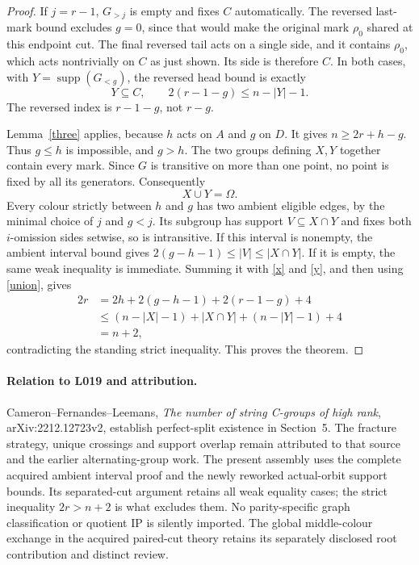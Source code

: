 \documentclass[11pt,a4paper]{article}
\begin{document}
\begin{proof}
If $j=r-1$, $G_{>j}$ is empty and fixes $C$ automatically.
The reversed last-mark bound excludes $g=0$, since that
would make the original mark $\rho_0$ shared at this
endpoint cut. The final reversed tail acts on a single
side, and it contains $\rho_0$, which acts nontrivially
on $C$ as just shown. Its side is therefore $C$.
In both cases, with $Y=\operatorname{supp}(G_{<g})$,
the reversed head bound is exactly
\begin{equation}\label{y}
 Y\subseteq C,\qquad 2(r-1-g)\le n-|Y|-1.
\end{equation}
The reversed index is $r-1-g$, not $r-g$.

Lemma~\ref{three} applies, because $h$ acts on $A$ and
$g$ on $D$. It gives $n\ge2r+h-g$. Thus $g\le h$
is impossible, and $g>h$.
The two groups defining $X,Y$ together contain every
mark. Since $G$ is transitive on more than one point,
no point is fixed by all its generators. Consequently
\begin{equation}\label{union}
                         X\cup Y=\Omega.
\end{equation}
Every colour strictly between $h$ and $g$ has two ambient
eligible edges, by the minimal choice of $j$ and $g<j$.
Its subgroup has support $V\subseteq X\cap Y$ and fixes
both $i$-omission sides setwise, so is intransitive.
If this interval is nonempty, the ambient interval bound
gives $2(g-h-1)\le |V|\le|X\cap Y|$. If it is empty,
the same weak inequality is immediate. Summing it with
\eqref{x} and \eqref{y}, and then using \eqref{union},
gives
\[
\begin{split}
 2r&=2h+2(g-h-1)+2(r-1-g)+4\\
   &\le(n-|X|-1)+|X\cap Y|+(n-|Y|-1)+4\\
   &=n+2,
\end{split}
\]
contradicting the standing strict inequality. This proves
the theorem.
\end{proof}

\paragraph{Relation to L019 and attribution.}
Cameron--Fernandes--Leemans, \emph{The number of string
C-groups of high rank}, arXiv:2212.12723v2, establish
perfect-split existence in Section~5. The fracture strategy,
unique crossings and support overlap remain attributed to
that source and the earlier alternating-group work.
The present assembly uses the complete acquired ambient
interval proof and the newly reworked actual-orbit support
bounds. Its separated-cut argument retains all weak equality
cases; the strict inequality $2r>n+2$ is what excludes them.
No parity-specific graph classification or quotient IP is
silently imported. The global middle-colour exchange in the
acquired paired-cut theory retains its separately disclosed
root contribution and distinct review.
\end{document}
